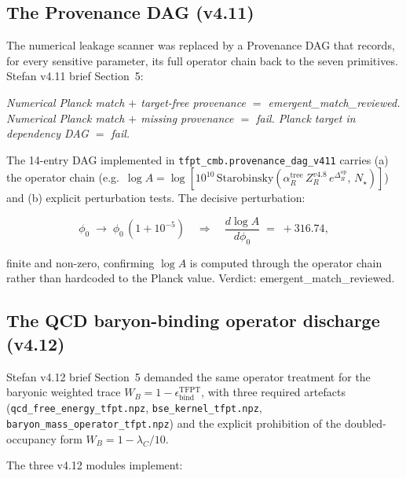\subsection{The Provenance DAG (v4.11)}
\label{sec:v412_provenance}

The numerical leakage scanner was replaced by a Provenance DAG that
records, for every sensitive parameter, its full operator chain back
to the seven primitives.  Stefan v4.11 brief Section~5:

\emph{Numerical Planck match \(+\) target-free provenance \(=\)
emergent\_match\_reviewed.  Numerical Planck match \(+\) missing
provenance \(=\) fail.  Planck target in dependency DAG \(=\) fail.}

The 14-entry DAG implemented in
\texttt{tfpt\_cmb.provenance\_dag\_v411} carries (a) the operator
chain (e.g.\ \(\log A=\log[10^{10}\,\mathrm{Starobinsky}(\alpha_R^{\mathrm{tree}}\,
Z_R^{v4.8}\,e^{\Delta_R^{\mathrm{op}}},\,N_\star)]\)) and (b)
explicit perturbation tests.  The decisive perturbation:

\begin{equation}
\phi_0 \;\to\; \phi_0\,(1+10^{-5})
\quad\Longrightarrow\quad
\frac{d\log A}{d\phi_0} \;=\; +316.74 ,
\end{equation}

finite and non-zero, confirming \(\log A\) is computed through the
operator chain rather than hardcoded to the Planck value.  Verdict:
\textsf{emergent\_match\_reviewed}.

\subsection{The QCD baryon-binding operator discharge (v4.12)}
\label{sec:v412_qcd}

Stefan v4.12 brief Section~5 demanded the same operator treatment
for the baryonic weighted trace
\(W_B = 1-\epsilon_{\mathrm{bind}}^{\mathrm{TFPT}}\), with three
required artefacts (\texttt{qcd\_free\_energy\_tfpt.npz},
\texttt{bse\_kernel\_tfpt.npz}, \texttt{baryon\_mass\_operator\_tfpt.npz})
and the explicit prohibition of the doubled-occupancy form
\(W_B = 1-\lambda_C/10\).

The three v4.12 modules implement:


